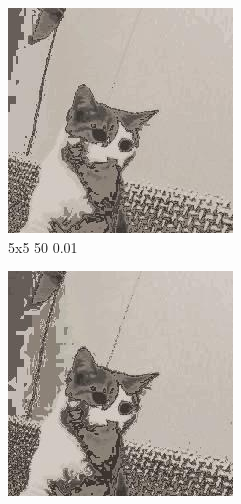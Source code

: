 \documentclass[12pt,a4paper]{article}
\begin{document}
\begin{figure}[H]
\medskip
\begin{subfigure}{0.25\textwidth}
  \includegraphics[width=\linewidth]{images/small/5-5-50-001}
  \caption{5x5 50 0.01}
  \label{fig:4}
\end{subfigure}\hfil %
\begin{subfigure}{0.25\textwidth}
  \includegraphics[width=\linewidth]{images/small/5-5-255-05}

\end{subfigure}
\end{figure}
\end{document}
